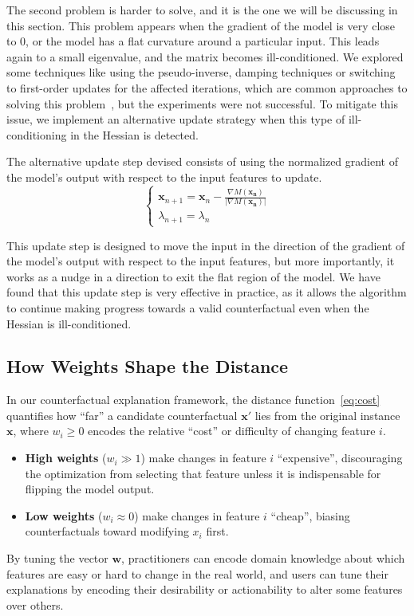 \documentclass[12pt]{extarticle}
\numberwithin{equation}{section}
\begin{document}
The second problem is harder to solve, and it is the one we will be discussing in this section. This problem appears when the gradient of the model is very close to 0, or the model has a flat curvature around a particular input. This leads again to a small eigenvalue, and the matrix becomes ill-conditioned. We explored some techniques like using the pseudo-inverse, damping techniques or switching to first-order updates for the affected iterations, which are common approaches to solving this problem~\cite{numopt}, but the experiments were not successful. To mitigate this issue, we implement an alternative update strategy when this type of ill-conditioning in the Hessian is detected.

The alternative update step devised consists of using the normalized gradient of the model's output with respect to the input features to update. 
\begin{equation}
    \begin{cases}
    \mathbf{x}_{n+1} = \mathbf{x}_n - \frac{\nabla M(\mathbf{x_n})}{|\nabla M(\mathbf{x_n})|}
    \\
    \lambda_{n+1} = \lambda_n
    \end{cases}
\end{equation}

This update step is designed to move the input in the direction of the gradient of the model's output with respect to the input features, but more importantly, it works as a nudge in a direction to exit the flat region of the model. We have found that this update step is very effective in practice, as it allows the algorithm to continue making progress towards a valid counterfactual even when the Hessian is ill-conditioned. 

\subsection{How Weights Shape the Distance}\label{sec:weights}
In our counterfactual explanation framework, the distance function~\eqref{eq:cost} quantifies how “far” a candidate counterfactual \(\mathbf{x}'\) lies from the original instance \(\mathbf{x}\), where \(w_i \ge 0\) encodes the relative “cost” or difficulty of changing feature \(i\).

\begin{itemize}
  \item \textbf{High weights} (\(w_i \!\!\gg\! 1\)) make changes in feature \(i\) “expensive”, discouraging the optimization from selecting that feature unless it is indispensable for flipping the model output.
  \item \textbf{Low weights} (\(w_i \!\!\approx\! 0\)) make changes in feature \(i\) “cheap”, biasing counterfactuals toward modifying \(x_i\) first.
\end{itemize}
By tuning the vector \(\mathbf{w}\), practitioners can encode domain knowledge about which features are easy or hard to change in the real world, and users can tune their explanations by encoding their desirability or actionability to alter some features over others.
\end{document}
